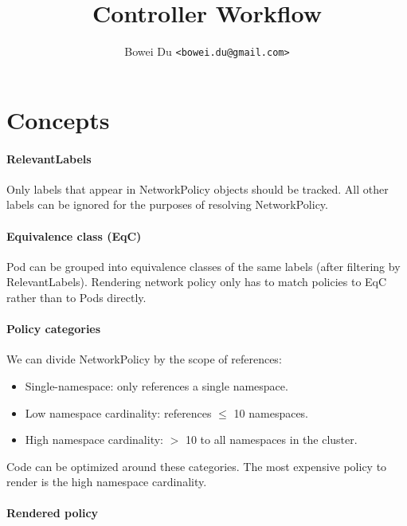 \documentclass[11pt]{article}
\begin{document}
\title{Controller Workflow}
\author{Bowei Du {\tt <bowei.du@gmail.com>}}
\date{}
\maketitle

\newcommand{\podeqc}{$\text{EQC}_{\text{pod}}$}

\section{Concepts}

\paragraph{RelevantLabels} 

Only labels that appear in NetworkPolicy objects should be tracked. All other
labels can be ignored for the purposes of resolving NetworkPolicy.

\paragraph{Equivalence class (EqC)}

Pod can be grouped into equivalence classes of the same labels (after filtering
by RelevantLabels). Rendering network policy only has to match policies to EqC
rather than to Pods directly.

\paragraph{Policy categories}

We can divide NetworkPolicy by the scope of references:

\begin{itemize}
    \item Single-namespace: only references a single namespace.
    \item Low namespace cardinality: references $\leq$ 10 namespaces.
    \item High namespace cardinality: $>$ 10 to all namespaces in the cluster.
\end{itemize}

Code can be optimized around these categories. The most expensive policy to
render is the high namespace cardinality.

\paragraph{Rendered policy}
\end{document}
